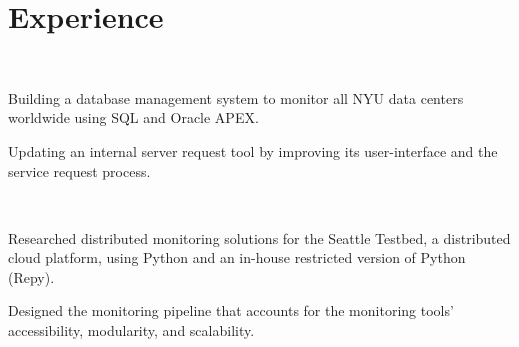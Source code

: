 \documentclass[]{hieudo-build}
\begin{document}
\begin{minipage}[t]{0.34\textwidth}

\sectionsep

%
%
\end{minipage} 
\hfill
\begin{minipage}[t]{0.65\textwidth} 

\section{Experience}

\\
\vspace{0.9em} %
\begin{tightemize}
\item Building a database management system to monitor all NYU data centers worldwide using SQL and Oracle APEX.
\item Updating an internal server request tool by improving its user-interface and the service request process.
\end{tightemize}
\sectionsep

 \\
\begin{tightemize}
\item Researched distributed monitoring solutions for the Seattle Testbed, a distributed cloud platform, using Python and an in-house restricted version of Python (Repy).
\item Designed the monitoring pipeline that accounts for the monitoring tools' accessibility, modularity, and scalability.
\end{tightemize}
\sectionsep


\end{minipage}
\end{document}
